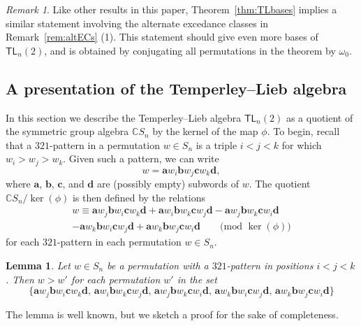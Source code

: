 \documentclass[12pt]{amsart}
\newtheorem{lem}[equation]{Lemma}
\theoremstyle{definition}
\theoremstyle{remark}
\newtheorem{rem}[equation]{Remark}
\numberwithin{equation}{section}
\newcommand{\CC}{\mathbb{C}}
\newcommand{\TL}{\mathsf{TL}}
\begin{document}
\begin{rem}
Like other results in this paper, Theorem~\ref{thm:TLbases} implies a similar statement involving the alternate excedance classes in Remark~\ref{rem:altECs} (1).  This statement should give even more bases of $\TL_{n}(2)$, and is obtained by conjugating all permutations in the theorem by $\omega_0$.
\end{rem}

\subsection{A presentation of the Temperley--Lieb algebra}
\label{sec:TLpres}

In this section we describe the Temperley--Lieb algebra $\TL_{n}(2)$ as a quotient of the symmetric group algebra $\CC S_{n}$ by the kernel of the map $\phi$.  
To begin, recall that a $321$-pattern in a permutation $w \in S_{n}$ is a triple $i < j < k$ for which $w_{i} > w_{j} > w_{k}$.  Given such a pattern, we can write
\[
w = \mathbf{a}w_{i}\mathbf{b}w_{j}\mathbf{c}w_{k}\mathbf{d},
\]
where $\mathbf{a}$, $\mathbf{b}$, $\mathbf{c}$, and $\mathbf{d}$ are (possibly empty) subwords of $w$.  The quotient $\CC S_{n} / \ker(\phi)$ is then defined by the relations
\begin{multline}
\label{eq:321relation}
w \equiv \mathbf{a}w_{j}\mathbf{b}w_{i}\mathbf{c}w_{k}\mathbf{d} + \mathbf{a}w_{i}\mathbf{b}w_{k}\mathbf{c}w_{j}\mathbf{d} - \mathbf{a}w_{j}\mathbf{b}w_{k}\mathbf{c}w_{i}\mathbf{d} \\
- \mathbf{a}w_{k}\mathbf{b}w_{i}\mathbf{c}w_{j}\mathbf{d} + \mathbf{a}w_{k}\mathbf{b}w_{j}\mathbf{c}w_{i}\mathbf{d}  \qquad \text{(mod $\ker(\phi)$)}
\end{multline}
for each $321$-pattern in each permutation $w \in S_{n}$.

\begin{lem}
\label{lem:321reducebruhat}
Let $w \in S_{n}$ be a permutation with a $321$-pattern in positions $i < j < k$.  Then $w > w'$ for each permutation $w'$ in the set
\[
\{
\mathbf{a}w_{j}\mathbf{b}w_{i}\mathbf{c}w_{k}\mathbf{d},  \,
\mathbf{a}w_{i}\mathbf{b}w_{k}\mathbf{c}w_{j}\mathbf{d}, \,
\mathbf{a}w_{j}\mathbf{b}w_{k}\mathbf{c}w_{i}\mathbf{d}, \,
\mathbf{a}w_{k}\mathbf{b}w_{i}\mathbf{c}w_{j}\mathbf{d}, \,
\mathbf{a}w_{k}\mathbf{b}w_{j}\mathbf{c}w_{i}\mathbf{d}
\}
\]
\end{lem}

The lemma is well known, but we sketch a proof for the sake of completeness.
\end{document}
